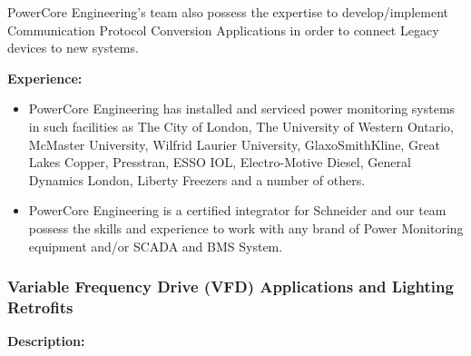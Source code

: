 PowerCore Engineering's team also possess the expertise to develop/implement Communication Protocol Conversion Applications in order to connect Legacy devices to new systems.\\ 

\vspace{10 mm}

\noindent \textbf{Experience:}

\begin{itemize}
	\item PowerCore Engineering has installed and serviced power monitoring systems in such facilities as The City of London, The University of Western Ontario, McMaster University, Wilfrid Laurier University, GlaxoSmithKline, Great Lakes Copper, Presstran, ESSO IOL, Electro-Motive Diesel, General Dynamics London, Liberty Freezers and a number of others.
	\item PowerCore Engineering is a certified integrator for Schneider and our team possess the skills and experience to work with any brand of Power Monitoring equipment and/or SCADA and BMS System.
\end{itemize}

\pagebreak

\subsubsection{Variable Frequency Drive (VFD) Applications and Lighting Retrofits}
\label{ETQ:PCEExp:VFD}


\noindent \textbf{Description:}\\
	

